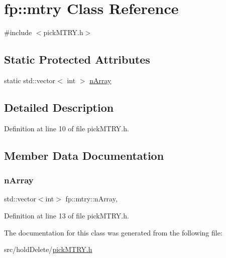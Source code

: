 \hypertarget{classfp_1_1mtry}{}\section{fp\+:\+:mtry Class Reference}
\label{classfp_1_1mtry}


{\ttfamily \#include $<$pick\+M\+T\+R\+Y.\+h$>$}

\subsection*{Static Protected Attributes}
\begin{DoxyCompactItemize}
\item 
static std\+::vector$<$ int $>$ \hyperlink{classfp_1_1mtry_aa06bd379a283322ef1d770bc4844a81a}{n\+Array}
\end{DoxyCompactItemize}


\subsection{Detailed Description}


Definition at line 10 of file pick\+M\+T\+R\+Y.\+h.



\subsection{Member Data Documentation}
\mbox{\label{classfp_1_1mtry_aa06bd379a283322ef1d770bc4844a81a}} 
\subsubsection{\texorpdfstring{n\+Array}{nArray}}
{\footnotesize\ttfamily std\+::vector$<$int$>$ fp\+::mtry\+::n\+Array\hspace{0.3cm}{\ttfamily [static]}, {\ttfamily [protected]}}



Definition at line 13 of file pick\+M\+T\+R\+Y.\+h.



The documentation for this class was generated from the following file\+:\begin{DoxyCompactItemize}
\item 
src/hold\+Delete/\hyperlink{pickMTRY_8h}{pick\+M\+T\+R\+Y.\+h}\end{DoxyCompactItemize}
